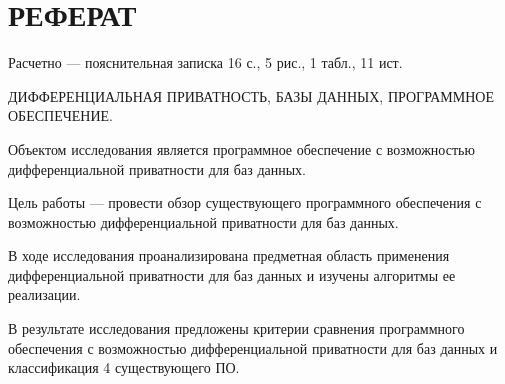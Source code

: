 \chapter*{РЕФЕРАТ}

Расчетно --- пояснительная записка 16 с., 5 рис., 1 табл., 11 ист.

ДИФФЕРЕНЦИАЛЬНАЯ ПРИВАТНОСТЬ, БАЗЫ ДАННЫХ, ПРОГРАММНОЕ ОБЕСПЕЧЕНИЕ.

Объектом исследования является программное обеспечение с возможностью
дифференциальной приватности для баз данных.

Цель работы --- провести обзор существующего программного обеспечения с возможностью
дифференциальной приватности для баз данных.

В ходе исследования проанализирована предметная область применения дифференциальной приватности для баз данных и изучены алгоритмы ее реализации.

В результате исследования предложены критерии сравнения программного обеспечения с возможностью дифференциальной приватности для баз данных и классификация 4 существующего ПО.